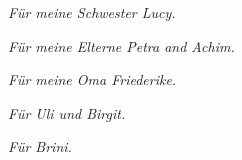 \thispagestyle{empty}
{}

\vspace*{5cm}

\begin{center}
\textit{Für meine Schwester Lucy.}

\textit{Für meine Elterne Petra and Achim.}

\textit{Für meine Oma Friederike.}

\textit{Für Uli und Birgit.}

\textit{Für Brini.}


\end{center}
